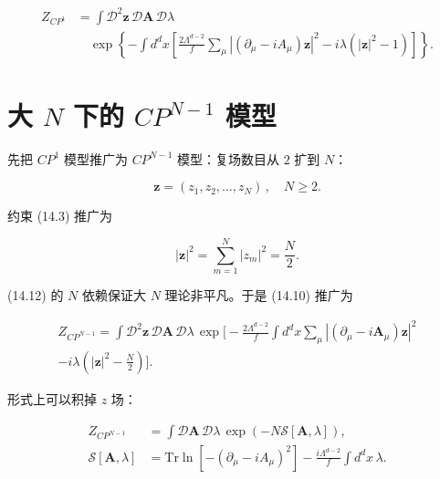 \begin{align*}
Z_{CP^{1}} & = \int \mathcal {D} ^ {2} \mathbf {z} \, \mathcal {D} \mathbf {A} \, \mathcal {D} \lambda\\
& \quad \exp \left\{ - \int d ^ {d} x \left[ \frac {2 \Lambda^ {d - 2}}{f} \sum_ {\mu} \left| \left( \partial_ {\mu} - i A _ {\mu} \right) \mathbf {z} \right| ^ {2} - i \lambda \left( | \mathbf {z} | ^ {2} - 1 \right) \right] \right\} .
\tag{14.10}
\end{align*}

\section{大 $N$ 下的 $CP^{N - 1}$ 模型}

先把 $CP^{1}$ 模型推广为 $CP^{N-1}$ 模型：复场数目从 $2$ 扩到 $N$：

\begin{equation*}
\mathbf {z} = \left( z _ {1}, z _ {2}, \dots , z _ {N} \right) \, , \quad N \geq 2.
\tag{14.11}
\end{equation*}

约束 (14.3) 推广为

\begin{equation*}
| \mathbf {z} | ^ {2} = \sum_ {m = 1} ^ {N} | z _ {m} | ^ {2} = \frac {N}{2}.
\tag{14.12}
\end{equation*}

(14.12) 的 $N$ 依赖保证大 $N$ 理论非平凡。于是 (14.10) 推广为

\begin{align*}
Z_{CP^{N - 1}} = \int \mathcal {D} ^ {2} \mathbf {z} \, \mathcal {D} \mathbf {A} \, \mathcal {D} \lambda \, \exp \Big[ - \frac {2 \Lambda^ {d - 2}}{f} \int d ^ {d} x \sum_ {\mu} \left| \left( \partial_ {\mu} - i \mathbf {A} _ {\mu} \right) \mathbf {z} \right| ^ {2}\\
- i \lambda \left( | \mathbf {z} | ^ {2} - \frac {N}{2} \right) \Big] .
\tag{14.13}
\end{align*}

形式上可以积掉 $z$ 场：

\begin{align*}
Z_{CP^{N - 1}} & = \int \mathcal {D} \mathbf {A} \, \mathcal {D} \lambda \, \exp \left( - N \mathcal {S} [ \mathbf {A}, \lambda ] \right) ,\\
\mathcal {S} [ \mathbf {A}, \lambda ] & = \mathrm{Tr} \ln \left[ - \left( \partial_ {\mu} - i A _ {\mu} \right) ^ {2} \right] - \frac {i \Lambda^ {d - 2}}{f} \int d ^ {d} x \, \lambda .
\tag{14.14}
\end{align*}

